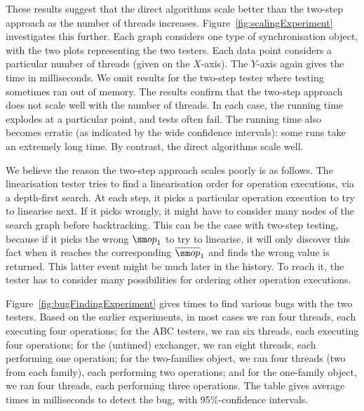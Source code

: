 

These results suggest that the direct algorithms scale better than the
two-step approach as the number of threads increases.
Figure~\ref{fig:scalingExperiment} investigates this further.  Each graph
considers one type of synchronisation object, with the two plots representing
the two testers.  Each data point considers a particular number of threads
(given on the $X$-axis).
The $Y$-axis again gives the time in milliseconds.  We omit results for the
two-step tester where testing sometimes ran out of memory.
%
The results confirm that the two-step approach does not scale well with the
number of threads.  In each case, the running time explodes at a particular
point, and tests often fail.  The running time also becomes erratic (as
indicated by the wide confidence intervals): some runs take an extremely long
time.  By contrast, the direct algorithms scale well.




We believe the reason the two-step approach scales poorly is as follows.  The
linearisation tester tries to find a linearisation order for operation
executions, via a depth-first search.  At each step, it picks a particular
operation execution to try to linearise next.  If it picks wrongly, it might
have to consider many nodes of the search graph before backtracking.  This can
be the case with two-step testing, because if it picks the wrong $\op_1$ to try
to linearise, it will only discover this fact when it reaches the
corresponding $\overline{\op}_1$ and finds the wrong value is returned.  This
latter event might be much later in the history.  To reach it, the tester has
to consider many possibilities for ordering other operation executions.


Figure~\ref{fig:bugFindingExperiment} gives times to find various bugs with
the two testers.  Based on the earlier experiments, in most cases we ran four
threads, each executing four operations; for the ABC testers, we ran six
threads, each executing four operations; for the (untimed) exchanger, we ran
eight threads, each performing one operation; for the two-families object, we
ran four threads (two from each family), each performing two operations; and
for the one-family object, we ran four threads, each performing three
operations.  The table gives average times in milliseconds to detect the bug,
with 95\%-confidence intervals.

